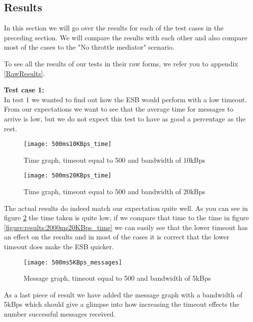 \subsection{Results}\label{Testing:Results}
	In this section we will go over the results for each of the test cases in the preceding section. We will compare the results with each other and also compare most of the cases to the "No throttle mediator" scenario.
	
	\begin{shaded}
	To see all the results of our tests in their raw forms, we refer you to appendix \ref{RawResults}.
	\end{shaded}
	 
    \textbf{Test case 1:}\\
    In test 1 we wanted to find out how the ESB would perform with a low timeout. From our expectations we want to see that the average time for messages to arrive is low, but we do not expect this test to have as good a percentage as the rest. 
    
	\begin{figure}[H]
		\centering
		\texttt{[image: 500ms10KBps\_time]}
		\caption{Time graph, timeout equal to 500 and bandwidth of 10kBps} 
		\label{figure:results:500ms10KBps_time}
	\end{figure}
	
	\begin{figure}[H]
		\centering
		\texttt{[image: 500ms20KBps\_time]}
		\caption{Time graph, timeout equal to 500 and bandwidth of 20kBps} 
		\label{figure:results:500ms20KBps_time}
	\end{figure}
    
    The actual results do indeed match our expectation quite well. As you can see in figure \ref{figure:results:500ms20KBps_time} the time taken is quite low, if we compare that time to the time in figure \ref{figure:results:2000ms20KBps_time} we can easily see that the lower timeout has an effect on the results and in most of the cases it is correct that the lower timeout does make the ESB quicker.
    
    \begin{figure}[H]
		\centering
		\texttt{[image: 500ms5KBps\_messages]}
		\caption{Message graph, timeout equal to 500 and bandwidth of 5kBps} 
		\label{figure:results:500ms5KBps_messages}
	\end{figure}
	
	As a last piece of result we have added the message graph with a bandwidth of 5kBps which should give a glimpse into how increasing the timeout effects the number successful messages received.
    
